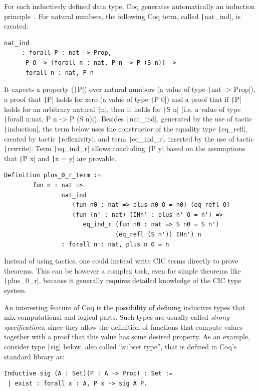 \documentclass[oneside,12pt]{scrbook}
\theoremstyle{definition}
\newcommand{\coq}[1]{\texttt|#1|}
\theoremstyle{plain}
\theoremstyle{definition}
\begin{document}
For each inductively defined data type,
Coq generates automatically an induction principle~\cite[Chapter
14]{Bertot2010}. For natural numbers, the following Coq term, called
\coq{nat_ind}, is created: 
\begin{verbatim}
nat_ind
     : forall P : nat -> Prop,
      P O -> (forall n : nat, P n -> P (S n)) ->
      forall n : nat, P n
\end{verbatim}
It expects a property (\coq{P}) over natural numbers (a value of type
\coq{nat -> Prop}), a proof that \coq{P} holds for zero (a value of
type \coq{P 0}) and a proof that if \coq{P} holds for an arbitrary
natural \coq{n}, then it holds for \coq{S n} (i.e. a value of type
\coq{forall n:nat, P n -> P (S n)}). Besides \coq{nat_ind}, generated by
the use of tactic \coq{induction}, the term below 
uses the constructor of the equality
type \coq{eq_refl}, created by tactic \coq{reflexivity}, and term
\coq{eq_ind_r}, inserted by the use of tactic \coq{rewrite}. Term
\coq{eq_ind_r} allows concluding \coq{P y} based on the assumptions
that \coq{P x} and \coq{x = y} are provable.

\begin{verbatim}
Definition plus_0_r_term :=
        fun n : nat =>
                nat_ind
                   (fun n0 : nat => plus n0 O = n0) (eq_refl O)
                   (fun (n' : nat) (IHn' : plus n' O = n') =>
                      eq_ind_r (fun n0 : nat => S n0 = S n')
                               (eq_refl (S n')) IHn') n
                : forall n : nat, plus n O = n
\end{verbatim}  

Instead of using tactics, one could instead write CIC terms directly
to prove theorems.  This can be however a complex task, even for
simple theorems like \coq{plus_0_r}, because it generally requires
detailed knowledge of the CIC type system.

An interesting feature of Coq is the possibility of defining inductive
types that mix computational and logical parts. Such types are usually
called \emph{strong specifications}, since they allow the definition
of functions that compute values together with a proof that this value
has some desired property. As an example, consider type \coq{sig}
below, also called ``subset type'', that is defined in Coq's standard
library as:
\begin{verbatim}
Inductive sig (A : Set)(P : A -> Prop) : Set :=
 | exist : forall x : A, P x -> sig A P.
\end{verbatim}
\end{document}
